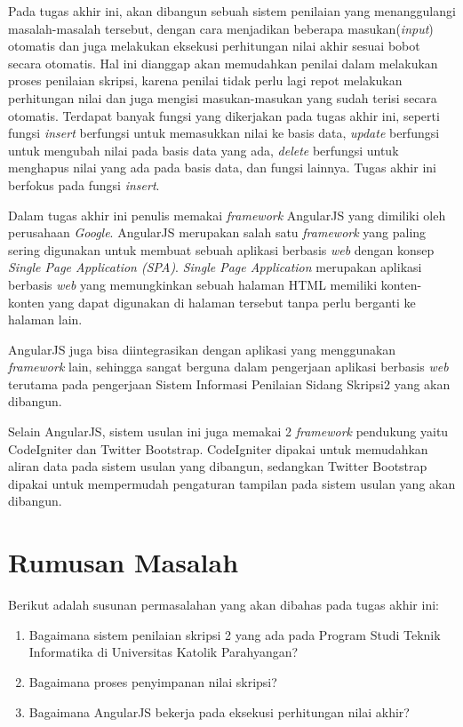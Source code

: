 	Pada tugas akhir ini, akan dibangun sebuah sistem penilaian yang menanggulangi masalah-masalah tersebut, dengan cara menjadikan beberapa masukan(\textit{input}) otomatis dan juga melakukan eksekusi perhitungan nilai akhir sesuai bobot secara otomatis. Hal ini dianggap akan memudahkan penilai dalam melakukan proses penilaian skripsi, karena penilai tidak perlu lagi repot melakukan perhitungan nilai dan juga mengisi masukan-masukan yang sudah terisi secara otomatis. Terdapat banyak fungsi yang dikerjakan pada tugas akhir ini, seperti fungsi \textit{insert} berfungsi untuk memasukkan nilai ke basis data, \textit{update} berfungsi untuk mengubah nilai pada basis data yang ada, \textit{delete} berfungsi untuk menghapus nilai yang ada pada basis data, dan fungsi lainnya. Tugas akhir ini berfokus pada fungsi \textit{insert}.
	
	Dalam tugas akhir ini penulis memakai \textit{framework} AngularJS yang dimiliki oleh perusahaan \textit{Google}. AngularJS merupakan salah satu \textit{framework} yang paling sering digunakan untuk membuat sebuah aplikasi berbasis \textit{web} dengan konsep \textit{Single Page Application (SPA)}. \textit{Single Page Application} merupakan aplikasi berbasis \textit{web} yang memungkinkan sebuah halaman HTML memiliki konten-konten yang dapat digunakan di halaman tersebut tanpa perlu berganti ke halaman lain.
	
	AngularJS juga bisa diintegrasikan dengan aplikasi yang menggunakan \textit{framework} lain, sehingga sangat berguna dalam pengerjaan aplikasi berbasis \textit{web} terutama pada pengerjaan Sistem Informasi Penilaian Sidang Skripsi2 yang akan dibangun.
	
	Selain AngularJS, sistem usulan ini juga memakai 2 \textit{framework} pendukung yaitu CodeIgniter dan Twitter Bootstrap. CodeIgniter dipakai untuk memudahkan aliran data pada sistem usulan yang dibangun, sedangkan Twitter Bootstrap dipakai untuk mempermudah pengaturan tampilan pada sistem usulan yang akan dibangun.
	
\section{Rumusan Masalah}
\label{sec: rumusanMasalah}

	Berikut adalah susunan permasalahan yang akan dibahas pada tugas akhir ini:
	\begin{enumerate}
		\item Bagaimana sistem penilaian skripsi 2 yang ada pada Program Studi Teknik Informatika di Universitas Katolik Parahyangan?
		\item Bagaimana proses penyimpanan nilai skripsi?
		\item Bagaimana AngularJS bekerja pada eksekusi perhitungan nilai akhir?
	\end{enumerate}

